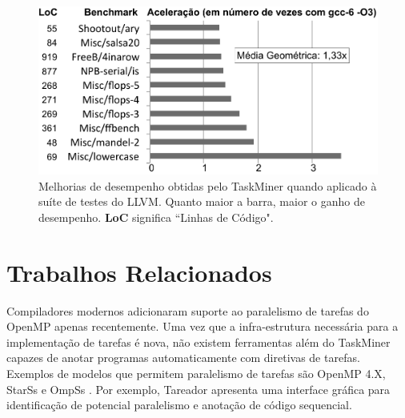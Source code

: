 \documentclass[sigplan,10pt]{acmart}
\newcommand\Taskminer{\mbox{\textsf{TaskMiner}}}
\begin{document}
\begin{figure}[t!]
\begin{center}
\includegraphics[width=1\columnwidth]{images/TM_GeneralProgs}
\caption{Melhorias de desempenho obtidas pelo \Taskminer{} quando aplicado à suíte de testes
do LLVM. Quanto maior a barra, maior o ganho de desempenho.
\textbf{LoC} significa ``Linhas de Código".}
\label{fig:TM_GeneralProgs}
\end{center}
\end{figure}




\section{Trabalhos Relacionados}
\label{sec:rw}

Compiladores modernos adicionaram suporte ao paralelismo de tarefas 
do OpenMP apenas recentemente. 
Uma vez que a infra-estrutura necessária para
a implementação de tarefas é nova, não existem ferramentas 
além do {\Taskminer} capazes de anotar programas
automaticamente com diretivas de tarefas. Exemplos
de modelos que permitem paralelismo de tarefas são OpenMP 4.X,
StarSs \cite{planas:hpca:2009} e OmpSs \cite{duran:ppl:2011}.
Por exemplo, Tareador \cite{Ayguade15} apresenta uma interface gráfica para identificação de potencial paralelismo e anotação de código sequencial.
\end{document}
